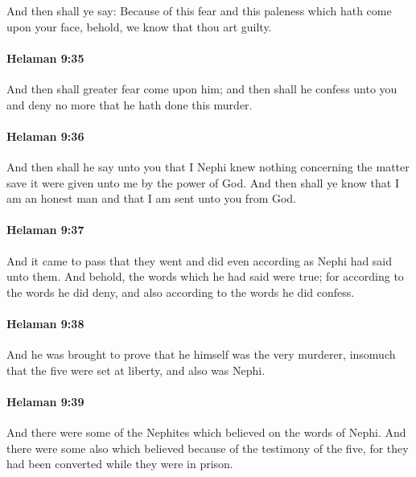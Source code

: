 			And then shall ye say:
			Because of this fear and this paleness which hath come upon your face,
			behold, we know that thou art guilty.

		\paragraph{Helaman 9:35} %
			\label{HELAMAN-9-35}

			And then shall greater fear come upon him;
			and then shall he confess unto you
			and deny no more that he hath done this murder.

		\paragraph{Helaman 9:36} %
			\label{HELAMAN-9-36}

			And then shall he say unto you
			that I Nephi knew nothing concerning the matter
			save it were given unto me by the power of God.
			And then shall ye know that I am an honest man
			and that I am sent unto you from God.

		\paragraph{Helaman 9:37} %
			\label{HELAMAN-9-37}

			And it came to pass that they went
			and did even according as Nephi had said unto them.
			And behold, the words which he had said were true;
			for according to the words he did deny,
			and also according to the words he did confess.

		\paragraph{Helaman 9:38} %
			\label{HELAMAN-9-38}

			And he was brought to prove that he himself was the very murderer,
			insomuch that the five were set at liberty, and also was Nephi.

		\paragraph{Helaman 9:39} %
			\label{HELAMAN-9-39}

			And there were some of the Nephites which believed on the words of Nephi.
			And there were some also which believed because of the testimony of the five,
			for they had been converted while they were in prison.

